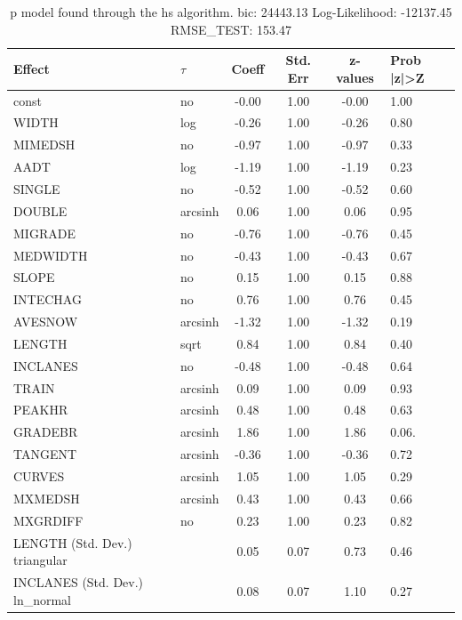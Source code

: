 \begin{table}
	\caption{p model found through the hs algorithm. bic: 24443.13 Log-Likelihood: -12137.45 RMSE_TEST: 153.47}
	\begin{center}
		\begin{tabular}{|l|l|c|c|c|l|}
			\hline
			Effect & $\tau$ & Coeff & Std. Err & z-values & Prob |z|>Z \\
			\hline
			const & no & -0.00 & 1.00 & -0.00 & 1.00 \\
			\hline
			WIDTH & log & -0.26 & 1.00 & -0.26 & 0.80 \\
			\hline
			MIMEDSH & no & -0.97 & 1.00 & -0.97 & 0.33 \\
			\hline
			AADT & log & -1.19 & 1.00 & -1.19 & 0.23 \\
			\hline
			SINGLE & no & -0.52 & 1.00 & -0.52 & 0.60 \\
			\hline
			DOUBLE & arcsinh & 0.06 & 1.00 & 0.06 & 0.95 \\
			\hline
			MIGRADE & no & -0.76 & 1.00 & -0.76 & 0.45 \\
			\hline
			MEDWIDTH & no & -0.43 & 1.00 & -0.43 & 0.67 \\
			\hline
			SLOPE & no & 0.15 & 1.00 & 0.15 & 0.88 \\
			\hline
			INTECHAG & no & 0.76 & 1.00 & 0.76 & 0.45 \\
			\hline
			AVESNOW & arcsinh & -1.32 & 1.00 & -1.32 & 0.19 \\
			\hline
			LENGTH & sqrt & 0.84 & 1.00 & 0.84 & 0.40 \\
			\hline
			INCLANES & no & -0.48 & 1.00 & -0.48 & 0.64 \\
			\hline
			TRAIN & arcsinh & 0.09 & 1.00 & 0.09 & 0.93 \\
			\hline
			PEAKHR & arcsinh & 0.48 & 1.00 & 0.48 & 0.63 \\
			\hline
			GRADEBR & arcsinh & 1.86 & 1.00 & 1.86 & 0.06. \\
			\hline
			TANGENT & arcsinh & -0.36 & 1.00 & -0.36 & 0.72 \\
			\hline
			CURVES & arcsinh & 1.05 & 1.00 & 1.05 & 0.29 \\
			\hline
			MXMEDSH & arcsinh & 0.43 & 1.00 & 0.43 & 0.66 \\
			\hline
			MXGRDIFF & no & 0.23 & 1.00 & 0.23 & 0.82 \\
			\hline
			LENGTH (Std. Dev.) triangular &  & 0.05 & 0.07 & 0.73 & 0.46 \\
			\hline
			INCLANES (Std. Dev.) ln_normal &  & 0.08 & 0.07 & 1.10 & 0.27 \\

\end{tabular}
\end{center}
\end{table}
